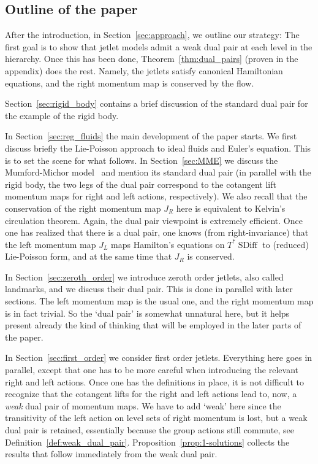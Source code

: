 \documentclass[12pt]{amsart}
\DeclareMathOperator{\SDiff}{SDiff}
\begin{document}
\subsection{Outline of the paper}
After the introduction, in Section~\ref{sec:approach}, we outline our strategy: The first goal is to show that jetlet models admit a weak dual pair at each level in the hierarchy. Once this has been done, Theorem~\ref{thm:dual_pairs} (proven in the appendix) does the rest. Namely, the jetlets satisfy canonical Hamiltonian equations, and the right momentum map is conserved by the flow.

Section~\ref{sec:rigid_body} contains a brief discussion of the standard dual pair for the example of the  rigid body.

In Section~\ref{sec:reg_fluids} the main development of the paper starts. We first discuss briefly the Lie-Poisson approach to ideal fluids and Euler's equation. This is to set the scene for what follows. In Section~\ref{sec:MME} we discuss the Mumford-Michor model~\cite{MumfordMichor2013} and mention its standard dual pair (in parallel with the rigid body, the two legs of the dual pair correspond to the cotangent lift momentum maps for right and left actions, respectively).
We also recall that the conservation of the right momentum map $J_R$ here is equivalent to Kelvin's circulation theorem. Again, the dual pair viewpoint is extremely efficient. Once one has realized that there is a dual pair, one knows (from right-invariance) that the left momentum map $J_L$ maps Hamilton's equations on $T^*\SDiff$ to (reduced) Lie-Poisson form, and at the same time that $J_R$ is conserved.

In Section~\ref{sec:zeroth_order} we introduce zeroth order jetlets, also called landmarks, and we discuss their dual pair. This is done in parallel with later sections. The left momentum map is the usual one, and the right momentum map is in fact trivial. So the `dual pair' is somewhat unnatural here, but it helps present already the kind of thinking that will be employed in the later parts of the paper. 
%

In Section~\ref{sec:first_order} we consider first order jetlets. Everything here goes in parallel, except that one has to be more careful when introducing the relevant right and left actions. Once one has the definitions in place, it is not difficult to recognize that the cotangent lifts for the right and left actions lead to, now, a \emph{weak} dual pair of momentum maps.
We have to add `weak' here since the transitivity of the left action on level sets of right momentum is lost, but a weak dual pair is retained, essentially because the group actions still commute, see Definition~\ref{def:weak_dual_pair}.  Proposition~\ref{prop:1-solutions} collects the results that follow immediately from the weak dual pair.
\end{document}
